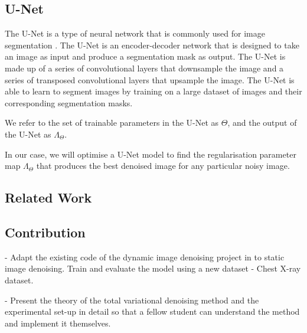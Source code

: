 \documentclass[12pt]{article}
\begin{document}



\subsection{U-Net}

The U-Net is a type of neural network that is commonly used for image segmentation \cite{ronneberger2015unet}.
The U-Net is an encoder-decoder network that is designed to take an image as input and produce a segmentation mask as output.
The U-Net is made up of a series of convolutional layers that downsample the image and a series of transposed convolutional layers that upsample the image.
The U-Net is able to learn to segment images by training on a large dataset of images and their corresponding segmentation masks.

We refer to the set of trainable parameters in the U-Net as $\Theta$, and the output of the U-Net as $\Lambda_{\Theta}$.

In our case, we will optimise a U-Net model to find the regularisation parameter map $\Lambda_{\Theta}$ that produces the best denoised image for any particular noisy image.


\subsection{Related Work}


\subsection{Contribution}

- Adapt the existing code of the dynamic image denoising project in \cite{kofler2023learning} to static image denoising. Train and evaluate the model using a new dataset - Chest X-ray dataset.

- Present the theory of the total variational denoising method and the experimental set-up in detail so that a fellow student can understand the method and implement it themselves.
\end{document}
